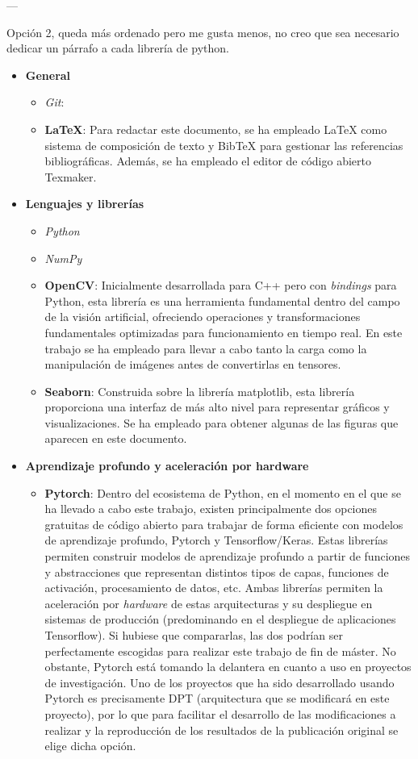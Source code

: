 ---

Opción 2, queda más ordenado pero me gusta menos, no creo que sea necesario dedicar un párrafo a cada librería de python.

\begin{itemize}
	\item \textbf{General}
	\begin{itemize}
		\item \textit{Git}: 
		\item \textbf{\LaTeX}: Para redactar este documento, se ha empleado LaTeX como sistema de composición de texto y BibTeX para gestionar las referencias bibliográficas. Además, se ha empleado el editor de código abierto Texmaker.
	\end{itemize}
	\item \textbf{Lenguajes y librerías}
	\begin{itemize}
		\item \textit{Python}
		\item \textit{NumPy}
		\item \textbf{OpenCV}: Inicialmente desarrollada para C++ pero con \textit{bindings} para Python, esta librería es una herramienta fundamental dentro del campo de la visión artificial, ofreciendo operaciones y transformaciones fundamentales optimizadas para funcionamiento en tiempo real. En este trabajo se ha empleado para llevar a cabo tanto la carga como la manipulación de imágenes antes de convertirlas en tensores.
		\item \textbf{Seaborn}: Construida sobre la librería matplotlib, esta librería proporciona una interfaz de más alto nivel para representar gráficos y visualizaciones. Se ha empleado para obtener algunas de las figuras que aparecen en este documento.
	\end{itemize}
	\item \textbf{Aprendizaje profundo y aceleración por hardware}
	\begin{itemize}
		\item \textbf{Pytorch}: Dentro del ecosistema de Python, en el momento en el que se ha llevado a cabo este trabajo, existen principalmente dos opciones gratuitas de código abierto para trabajar de forma eficiente con modelos de aprendizaje profundo, Pytorch y Tensorflow/Keras. Estas librerías permiten construir modelos de aprendizaje profundo a partir de funciones y abstracciones que representan distintos tipos de capas, funciones de activación, procesamiento de datos, etc. Ambas librerías permiten la aceleración por \textit{hardware} de estas arquitecturas y su despliegue en sistemas de producción (predominando en el despliegue de aplicaciones Tensorflow). Si hubiese que compararlas, las dos podrían ser perfectamente escogidas para realizar este trabajo de fin de máster. No obstante, Pytorch está tomando la delantera en cuanto a uso en proyectos de investigación. Uno de los proyectos que ha sido desarrollado usando Pytorch es precisamente DPT \cite{visiontransformersDPT} (arquitectura que se modificará en este proyecto), por lo que para facilitar el desarrollo de las modificaciones a realizar y la reproducción de los resultados de la publicación original se elige dicha opción.

\end{itemize}
\end{itemize}
